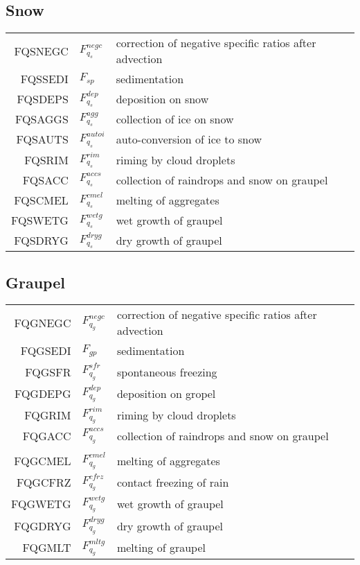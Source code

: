   \subsection{Snow}
  \begin{tabular}{rll}
       FQSNEGC      &$F_{q_s}^{negc}$ &correction of negative specific ratios after advection\\
       FQSSEDI      &$F_{sp}$ &sedimentation\\
       FQSDEPS      &$F_{q_s}^{dep}$ &deposition on snow\\
       FQSAGGS      &$F_{q_s}^{agg}$ &collection of ice on snow\\
       FQSAUTS      &$F_{q_s}^{autoi}$  &auto-conversion of ice to snow\\
       FQSRIM       &$F_{q_s}^{rim}$ &riming by cloud droplets\\
       FQSACC       &$F_{q_s}^{accs}$ &collection of raindrops and snow on graupel\\
       FQSCMEL      &$F_{q_s}^{cmel}$ &melting of aggregates\\
       FQSWETG      &$F_{q_s}^{wetg}$ &wet growth of graupel\\
       FQSDRYG      &$F_{q_s}^{dryg}$ &dry growth of graupel\\
  \end{tabular}

  \subsection{Graupel}
  \begin{tabular}{rll}
       FQGNEGC      &$F_{q_g}^{negc}$ &correction of negative specific ratios after advection\\
       FQGSEDI      &$F_{gp}$ &sedimentation\\
       FQGSFR       &$F_{q_g}^{sfr}$ &spontaneous freezing \\
       FQGDEPG      &$F_{q_g}^{dep}$  &deposition on gropel\\
       FQGRIM       &$F_{q_g}^{rim}$ &riming by cloud droplets\\
       FQGACC       &$F_{q_g}^{accs}$  &collection of raindrops and snow on graupel\\\\
       FQGCMEL      &$F_{q_g}^{cmel}$ &melting of aggregates\\
       FQGCFRZ      &$F_{q_g}^{cfrz}$ &contact freezing of rain\\
       FQGWETG      &$F_{q_g}^{wetg}$ &wet growth of graupel\\
       FQGDRYG      &$F_{q_g}^{dryg}$ &dry growth of graupel\\
       FQGMLT       &$F_{q_g}^{mltg}$ &melting of graupel\\

  \end{tabular}

